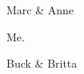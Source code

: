 \documentclass{article}
\begin{document}
\begin{Exercice}
Marc \& Anne
\end{Exercice}
\begin{Problem}
Me.
\end{Problem}
\begin{Exercice}
Buck \& Britta
\end{Exercice}
\end{document}
